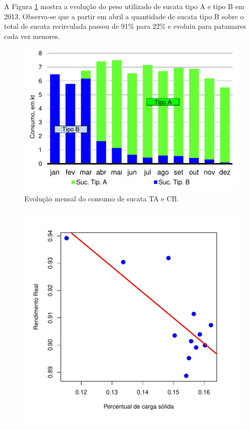 \begin{multicols}{2}
	A Figura \ref{fig:evol_tacb} mostra a evolução do peso utilizado de sucata tipo A e tipo B em 2013. Observa-se que a partir em abril a quantidade de sucata tipo B sobre o total de sucata recirculada passou de 91\% para 22\% e evoluiu para patamares cada vez menores. 		
	\begin{figure}[H]
		\centering
		\includegraphics[scale=0.55, bb=0 0 288 432, trim=0in 0in 0in 0in]{figures/fig08-excel.pdf} %
		\caption{Evolução mensal do consumo de sucata TA e CB\cite{rel4}.}
		\label{fig:evol_tacb}
	\end{figure}					
\newpage
	\begin{figure}[H]
		\centering
		\includegraphics[scale=0.4, bb=0 0 432 432, trim=0in 0in 0in 0in]{figures/fig03.pdf} %

\end{figure}
\end{multicols}
